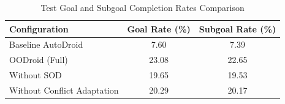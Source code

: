 \begin{table}[t]
\centering
\caption{Test Goal and Subgoal Completion Rates Comparison}
\label{tab:completion_rates}
\begin{tabular}{lcc}
\toprule
\textbf{Configuration} & \textbf{Goal Rate (\%)} & \textbf{Subgoal Rate (\%)} \\
\midrule
Baseline AutoDroid & 7.60 & 7.39 \\
OODroid (Full) & 23.08 & 22.65 \\
Without SOD & 19.65 & 19.53 \\
Without Conflict Adaptation & 20.29 & 20.17 \\
\bottomrule
\end{tabular}
\end{table}
